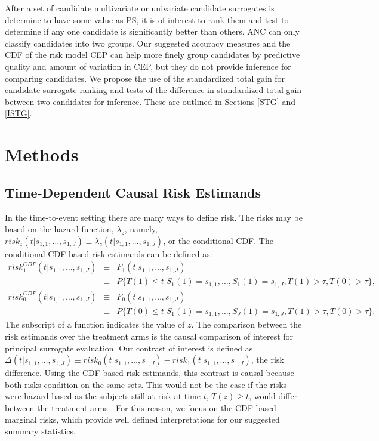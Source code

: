 \documentclass[times, doublespace]{simauth}
\begin{document}
After a set of candidate multivariate or univariate candidate surrogates is determine to have some value as PS, it is of interest to rank them and test to determine if any one candidate is significantly better than others. ANC can only classify candidates into two groups. Our suggested accuracy measures and the CDF of the risk model CEP can help more finely group candidates by predictive quality and amount of variation in CEP, but they do not provide inference for comparing candidates. We propose the use of the standardized total gain for candidate surrogate ranking and tests of the difference in standardized total gain between two candidates for inference. These are outlined in Sections \ref{STG} and \ref{ISTG}. 

\section{Methods}
\subsection{Time-Dependent Causal Risk Estimands} \label{CRE}
In the time-to-event setting there are many ways to define risk. The risks may be based on the hazard function, $\lambda_z$, namely, $risk_{z}(t|s_{1,1},\ldots,s_{1,J})\equiv\lambda_z(t|s_{1,1},\ldots,s_{1,J})$, or the conditional CDF. The conditional CDF-based risk estimands can be defined as:
\begin{eqnarray*}
risk_{1}^{CDF}(t|s_{1,1}, \ldots, s_{1,J}) &\equiv& F_1(t|s_{1,1}, \ldots, s_{1,J})\\
&\equiv& P\{T(1) \leq t|S_{1}(1)=s_{1,1},\ldots, S_{1}(1)=s_{1,J},T(1)> \tau, T(0)> \tau\},\\
risk_{0}^{CDF}(t|s_{1,1}, \ldots, s_{1,J}) &\equiv& F_0(t|s_{1,1}, \ldots, s_{1,J}) \\
&\equiv& P\{T(0) \leq t|S_{1}(1)=s_{1,1},\ldots, S_{J}(1)=s_{1,J},T(1)>\tau, T(0)>\tau\}.
\end{eqnarray*}
The subscript of a function indicates the value of $z$. The comparison between the risk estimands over the treatment arms is the causal comparison of interest for principal surrogate evaluation. Our contrast of interest is defined as $\Delta(t|s_{1,1}, \dots, s_{1,J}) \equiv risk_0(t|s_{1,1}, \ldots, s_{1,J})-risk_1(t|s_{1,1}, \ldots, s_{1,J})$, the risk difference. Using the CDF based risk estimands, this contrast is causal because both risks condition on the same sets. This would not be the case if the risks were hazard-based as the subjects still at risk at time $t$, $T(z)\geq t$, would differ between the treatment arms \citep{Hernan10, Gabriel13}. For this reason, we focus on the CDF based marginal risks, which provide well defined  interpretations for our suggested summary statistics.
\end{document}
